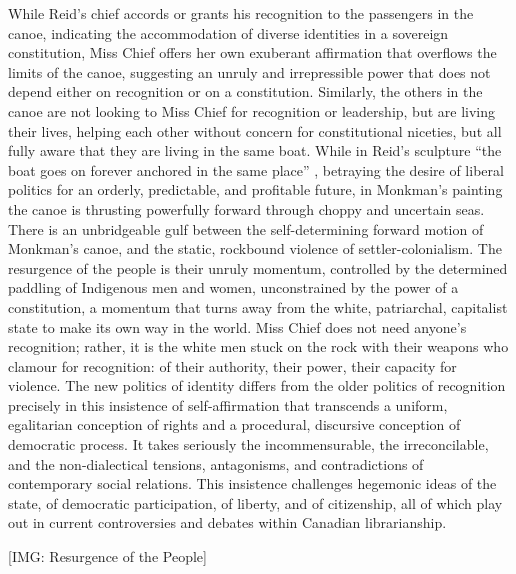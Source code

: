 \documentclass[12pt,oneside]{memoir}
\begin{document}
While Reid's chief accords or grants his recognition to the passengers in the canoe, indicating the accommodation of diverse identities in a sovereign constitution, Miss Chief offers her own exuberant affirmation that overflows the limits of the canoe, suggesting an unruly and irrepressible power that does not depend either on recognition or on a constitution. Similarly, the others in the canoe are not looking to Miss Chief for recognition or leadership, but are living their lives, helping each other without concern for constitutional niceties, but all fully aware that they are living in the same boat. While in Reid's sculpture ``the boat goes on forever anchored in the same place'' \citep[33]{Tully1995}, betraying the desire of liberal politics for an orderly, predictable, and profitable future, in Monkman's painting the canoe is thrusting powerfully forward through choppy and uncertain seas. There is an unbridgeable gulf between the self-determining forward motion of Monkman's canoe, and the static, rockbound violence of settler-colonialism. The resurgence of the people is their unruly momentum, controlled by the determined paddling of Indigenous men and women, unconstrained by the power of a constitution, a momentum that turns away from the white, patriarchal, capitalist state to make its own way in the world. Miss Chief does not need anyone's recognition; rather, it is the white men stuck on the rock with their weapons who clamour for recognition: of their authority, their power, their capacity for violence.
The new politics of identity differs from the older politics of recognition precisely in this insistence of self-affirmation that transcends a uniform, egalitarian conception of rights and a procedural, discursive conception of democratic process. It takes seriously the incommensurable, the irreconcilable, and the non-dialectical tensions, antagonisms, and contradictions of contemporary social relations. This insistence challenges hegemonic ideas of the state, of democratic participation, of liberty, and of citizenship, all of which play out in current controversies and debates within Canadian librarianship.

[IMG: Resurgence of the People]
\end{document}
